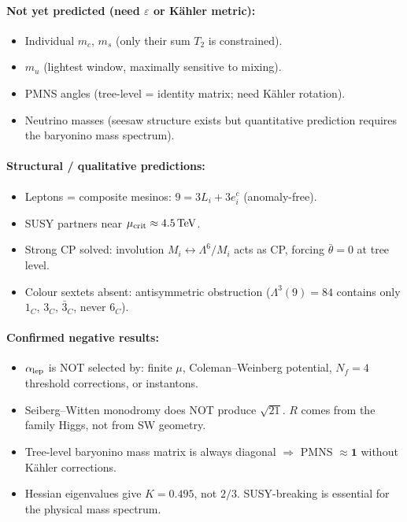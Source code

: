 \documentclass[12pt,a4paper]{article}
\newcommand{\TeV}{\,\mathrm{TeV}}
\begin{document}
\paragraph{Not yet predicted (need $\varepsilon$ or K\"ahler metric):}
\begin{itemize}
\item Individual $m_c$, $m_s$ (only their sum $T_2$ is constrained).
\item $m_u$ (lightest window, maximally sensitive to mixing).
\item PMNS angles (tree-level = identity matrix; need K\"ahler rotation).
\item Neutrino masses (seesaw structure exists but quantitative prediction
  requires the baryonino mass spectrum).
\end{itemize}

\paragraph{Structural / qualitative predictions:}
\begin{itemize}
\item Leptons = composite mesinos: $9 = 3L_i + 3e_i^c$ (anomaly-free).
\item SUSY partners near $\mu_{\rm crit} \approx 4.5\TeV$.
\item Strong CP solved: involution $M_i \leftrightarrow \Lambda^6/M_i$
  acts as CP, forcing $\bar{\theta} = 0$ at tree level.
\item Colour sextets absent: antisymmetric obstruction
  ($\Lambda^3(9) = 84$ contains only $1_C$, $3_C$, $\bar{3}_C$, never $6_C$).
\end{itemize}

\paragraph{Confirmed negative results:}
\begin{itemize}
\item $\alpha_{\rm lep}$ is NOT selected by: finite $\mu$, Coleman--Weinberg potential,
  $N_f = 4$ threshold corrections, or instantons.
\item Seiberg--Witten monodromy does NOT produce $\sqrt{21}$.
  $R$ comes from the family Higgs, not from SW geometry.
\item Tree-level baryonino mass matrix is always diagonal $\Rightarrow$
  PMNS $\approx \mathbf{1}$ without K\"ahler corrections.
\item Hessian eigenvalues give $K = 0.495$, not $2/3$.
  SUSY-breaking is essential for the physical mass spectrum.
\end{itemize}
\end{document}
